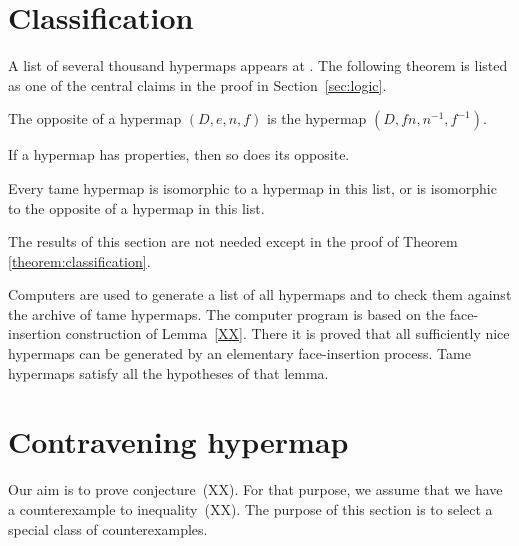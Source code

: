 \section{Classification}
    \label{sec:proof-classification}

\label{sec:classification}

A list of several thousand hypermaps appears at \cite{website:Hales:1998:Code}. The
following theorem is listed as one of the central claims in the
proof in Section~\ref{sec:logic}.

\begin{definition}[opposite] The opposite of a hypermap $(D,e,n,f)$ is the
hypermap $(D,f n,n^{-1},f^{-1})$.
\end{definition}

\begin{lemma} If a hypermap has properties, 
then so does its opposite.
\end{lemma}

\begin{theorem}
\label{theorem:classification} Every tame hypermap is isomorphic to
a hypermap in this list, or is isomorphic to the opposite of a
hypermap in this list.
\end{theorem}

The results of this section are not needed except in the proof of
Theorem \ref{theorem:classification}.

\smallskip

Computers are used to generate a list of all hypermaps and to check
them against the archive of tame hypermaps.  The computer program is
based on the face-insertion construction of Lemma~\ref{XX}.  There it is
proved that all sufficiently nice hypermaps can be generated by an
elementary face-insertion process.  Tame hypermaps satisfy all the
hypotheses of that lemma.

\section{Contravening hypermap}

Our aim is to prove conjecture~(XX).  For that purpose, we assume that
we have a counterexample to inequality~(XX).  The purpose of this section is to select a special class of counterexamples.

